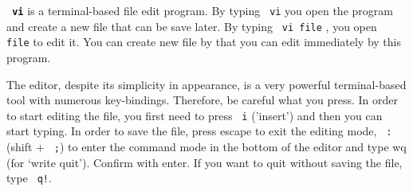 \textbf{ \texttt{ vi}} is a terminal-based file edit program. By typing \texttt{ vi} you open the program and create a new file that can be save later. By typing \texttt{ vi file} , you open \texttt{ file} to edit it. You can create new file by that you can edit immediately by this program. 

The editor, despite its simplicity in appearance, is a very powerful terminal-based tool with numerous key-bindings. Therefore, be careful what you press. In order to start editing the file, you first need to press \texttt{ i} ('insert') and then you can start typing. In order to save the file, press escape to exit the editing mode, \texttt{ :} (shift + \texttt{ ;}) to enter the command mode in the bottom of the editor and  type wq (for `write  quit'). Confirm with enter. If you want to quit without saving the file, type \texttt{ q!}. 





